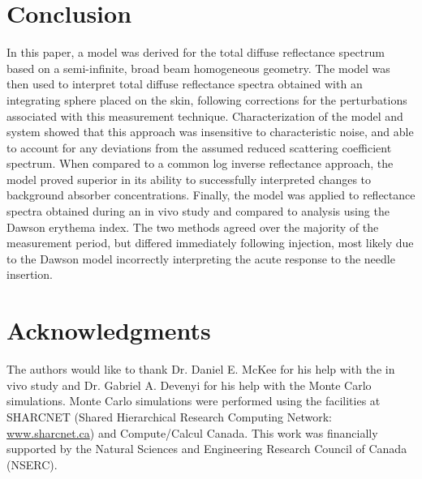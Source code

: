 \section{Conclusion}
In this paper, a model was derived for the total diffuse reflectance spectrum based on a semi-infinite, broad beam homogeneous geometry. The model was then used to interpret total diffuse reflectance spectra obtained with an integrating sphere placed on the skin, following corrections for the perturbations associated with this measurement technique. Characterization of the model and system showed that this approach was insensitive to characteristic noise, and able to account for any deviations from the assumed reduced scattering coefficient spectrum. When compared to a common log inverse reflectance approach, the model proved superior in its ability to successfully interpreted changes to background absorber concentrations. Finally, the model was applied to reflectance spectra obtained during an in vivo study and compared to analysis using the Dawson erythema index. The two methods agreed over the majority of the measurement period, but differed immediately following injection, most likely due to the Dawson model incorrectly interpreting the acute response to the needle insertion.

\section*{Acknowledgments}
The authors would like to thank Dr. Daniel E. McKee for his help with the in vivo study and Dr. Gabriel A. Devenyi for his help with the Monte Carlo simulations. Monte Carlo simulations were performed using the facilities at SHARCNET (Shared Hierarchical Research Computing Network: \url{www.sharcnet.ca}) and Compute/Calcul Canada. This work was financially supported by the Natural Sciences and Engineering Research Council of Canada (NSERC).